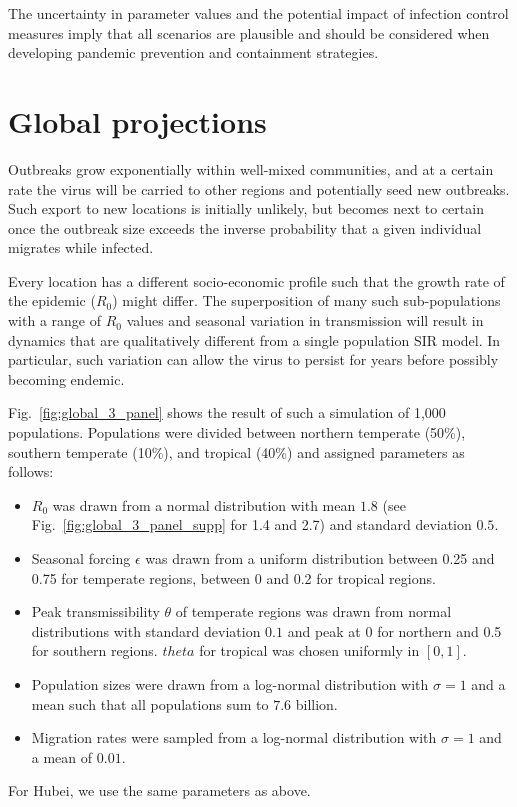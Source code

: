 \documentclass[rmp, reprint, superscriptaddress, floatfix,amsmath]{revtex4-1}
\begin{document}
The uncertainty in parameter values and the potential impact of infection control measures imply that all scenarios are plausible and should be considered when developing pandemic prevention and containment strategies.


\section{Global projections}
Outbreaks grow exponentially within well-mixed communities, and at a certain rate the virus will be carried to other regions and potentially seed new outbreaks. 
Such export to new locations is initially unlikely, but becomes next to certain once the outbreak size exceeds the inverse probability that a given individual migrates while infected.

Every location has a different socio-economic profile such that the growth rate of the epidemic ($R_0$) might differ. 
The superposition of many such sub-populations with a range of $R_0$ values and seasonal variation in transmission will result in dynamics that are qualitatively different from a single population SIR model. 
In particular, such variation can allow the virus to persist for years before possibly becoming endemic. 

Fig.~\ref{fig:global_3_panel} shows the result of such a simulation of 1,000 populations.
Populations were divided between northern temperate (50\%), southern temperate (10\%), and tropical (40\%) and assigned parameters as follows:
\begin{itemize}
    \item $R_0$ was drawn from a normal distribution with mean $1.8$ (see Fig.~\ref{fig:global_3_panel_supp} for 1.4 and 2.7) and standard deviation $0.5$.
    \item Seasonal forcing $\epsilon$ was drawn from a uniform distribution between 0.25 and 0.75 for temperate regions, between 0 and 0.2 for tropical regions.
    \item Peak transmissibility $\theta$ of temperate regions was drawn from normal distributions with standard deviation $0.1$ and peak at $0$ for northern and 0.5 for southern regions. $theta$ for tropical was chosen uniformly in $[0,1]$.
    \item Population sizes were drawn from a log-normal distribution with $\sigma=1$ and a mean such that all populations sum to $7.6$ billion.
    \item Migration rates were sampled from a log-normal distribution with $\sigma=1$ and a mean of $0.01$.
\end{itemize}
For Hubei, we use the same parameters as above.
\end{document}
